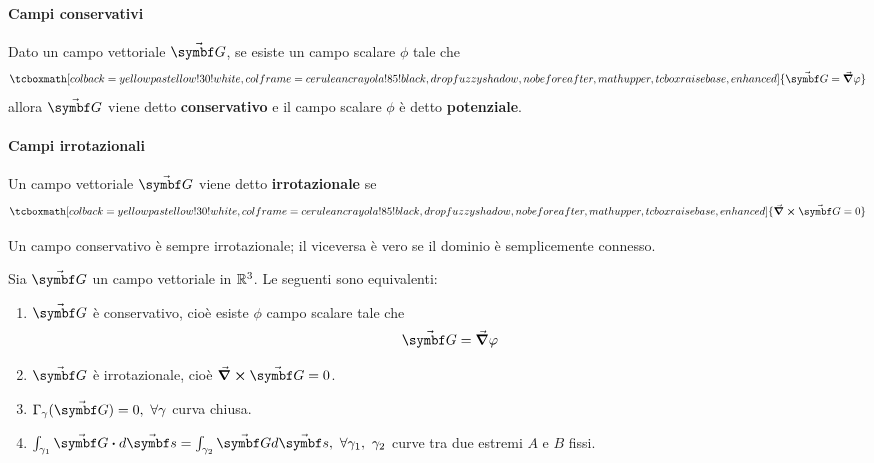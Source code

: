 \paragraph{Campi conservativi}
\begin{define}
	Dato un campo vettoriale $\vba{G}$, se esiste un campo scalare $\phi$ tale che \begin{equation}
		\tcboxmath[colback=yellowpastellow!30!white,colframe=ceruleancrayola!85!black,drop fuzzy shadow, nobeforeafter, math upper, tcbox raise base, enhanced]{\vba{G}=\grad{\phi}}
	\end{equation}
	allora $\vba{G}$ viene detto \textbf{conservativo} e il campo scalare $\phi$ è detto \textbf{potenziale}.
\end{define}
\paragraph{Campi irrotazionali}
\begin{define}
	Un campo vettoriale $\vba{G}$ viene detto \textbf{irrotazionale} se
	\begin{equation}
		\tcboxmath[colback=yellowpastellow!30!white,colframe=ceruleancrayola!85!black,drop fuzzy shadow, nobeforeafter, math upper, tcbox raise base, enhanced]{\curl{\vba{G}}=0}
	\end{equation}
\end{define}
\begin{propositionqed}
	Un campo conservativo è sempre irrotazionale; il viceversa è vero se il dominio è semplicemente connesso.
\end{propositionqed}
\begin{theoremaqed}
	Sia $\vba{G}$ un campo vettoriale in $\mathbb{R}^3$. Le seguenti sono equivalenti:
	\begin{enumerate}[label=\roman*)]
		\item $\vba{G}$ è conservativo, cioè esiste $\phi$ campo scalare tale che
		\begin{equation}
			\vba{G}=\grad{\phi}
		\end{equation}
		\item $\vba{G}$ è irrotazionale, cioè $\curl{\vba{G}}=0$.
		\item $\Gamma_{\gamma}(\vba{G})=0,\ \forall \gamma$ curva chiusa.
		\item $\int_{\gamma_1}\vba{G}\vdot d\vba{s}=\int_{\gamma_2}\vba{G}d\vba{s},\ \forall \gamma_1,\ \gamma_2$ curve tra due estremi $A$ e $B$ fissi.
	\end{enumerate}
\end{theoremaqed}
